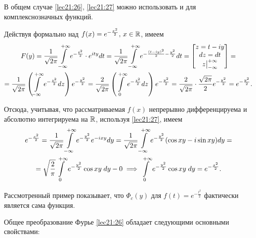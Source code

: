 \documentclass[../../main.tex]{subfiles}
\begin{document}
В общем случае \eqref{lec21:26}, \eqref{lec21:27} можно использовать и для  
комплекснозначных функций.

\begin{example}
  Действуя формально над  $f(x) = e^{-\frac{x^2}2}, \, x \in \mathbb{R}$, имеем
  \begin{multline*}
    F(y) = \frac1{\sqrt{2\pi}}\int\limits_{-\infty}^{+\infty} e^{-\frac{t^2}2} \cdot e^{ity} dt = 
    \frac1{\sqrt{2\pi}}\int\limits_{-\infty}^{+\infty} e^{-\frac{(t-iy)^2}2-\frac{y^2}2} dt =
    \begin{bmatrix}
      z = t-iy \\
      dz = dt \\
      z \big|_{-\infty}^{+\infty}
    \end{bmatrix} =\\ =
    \frac1{\sqrt{2\pi}} \left(\int\limits_{-\infty}^{+\infty} e^{-\frac{z^2}2} dz\right)
    e^{-\frac{y^2}2} = \frac{2}{\sqrt{2\pi}}\left(\int\limits_{0}^{+\infty} 
    e^{-\frac{z^2}2} dz\right) e^{-\frac{y^2}2} = \frac{2}{\sqrt{2\pi}}\cdot
    \frac{\sqrt{2\pi}}{2}e^{-\frac{y^2}2} =  e^{-\frac{y^2}2}.
  \end{multline*}
  
  Отсюда, учитывая, что рассматриваемая $f(x)$ непрерывно дифференцируема и 
  абсолютно интегрируема на $\mathbb{R}$, используя \eqref{lec21:27}, имеем
  \begin{multline*}
    e^{-\frac{x^2}2} = \frac{1}{\sqrt{2\pi}}\int\limits_{-\infty}^{+\infty} e^{-\frac{y^2}2}e^{-ixy} dy 
    =\frac{1}{\sqrt{2\pi}}\int\limits_{-\infty}^{+\infty} e^{-\frac{y^2}2}(\cos xy - i\sin xy) dy =\\= 
    \sqrt{\frac{2}{\pi}}\int\limits_{0}^{+\infty} e^{-\frac{y^2}2}\cos xy 
    \;dy - 
    0 \implies \int\limits_{0}^{+\infty} e^{-\frac{y^2}2}\cos xy\;dy = 
    e^{-\frac{x^2}2}.
  \end{multline*}
\end{example}

Рассмотренный пример показывает, что $\Phi_c(y)$ для $f(t) = e^{-\frac{t^2}2}$ 
фактически является сама функция.

Общее преобразование Фурье \eqref{lec21:26} обладает следующими основными
свойствами:
\end{document}
